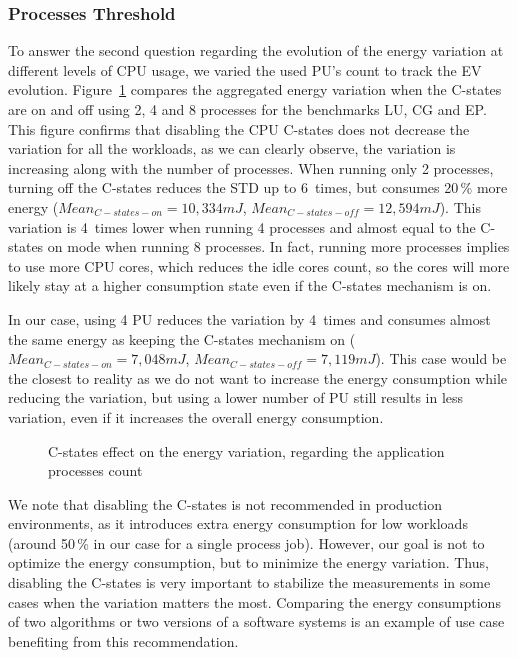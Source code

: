 \subsubsection{Processes Threshold}
To answer the second question regarding the evolution of the energy variation at different levels of CPU usage, we varied the used PU's count to track the EV evolution.
Figure~\ref{fig:process-tresh} compares the aggregated energy variation when the C-states are on and off using 2, 4 and 8 processes for the benchmarks \textsf{LU}, \textsf{CG} and \textsf{EP}.
This figure confirms that disabling the CPU C-states does not decrease the variation for all the workloads, as we can clearly observe, the variation is increasing along with the number of processes.
When running only 2 processes, turning off the C-states reduces the STD up to 6~times, but consumes 20\,\% more energy ($Mean_{C-states-on}=10,334 mJ$, $Mean_{C-states-off}=12,594 mJ$).
This variation is 4~times lower when running 4 processes and almost equal to the \textsf{C-states on} mode when running 8 processes.
In fact, running more processes implies to use more CPU cores, which reduces the idle cores count, so the cores will more likely stay at a higher consumption state even if the C-states mechanism is on.

In our case, using 4 PU reduces the variation by 4~times and consumes almost the same energy as keeping the C-states mechanism on ($Mean_{C-states-on}=7,048 mJ$, $Mean_{C-states-off}=7,119 mJ$).
This case would be the closest to reality as we do not want to increase the energy consumption while reducing the variation, but using a lower number of PU still results in less variation, even if it increases the overall energy consumption.

\begin{figure}
    \caption{C-states effect on the energy variation, regarding the application processes count}\label{fig:process-tresh}
\end{figure}

We note that disabling the C-states is not recommended in production environments, as it introduces extra energy consumption for low workloads (around 50\,\% in our case for a single process job).
However, our goal is not to optimize the energy consumption, but to minimize the energy variation.
Thus, disabling the C-states is very important to stabilize the measurements in some cases when the variation matters the most.
Comparing the energy consumptions of two algorithms or two versions of a software systems is an example of use case benefiting from this recommendation.

